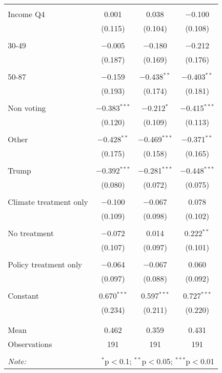 \begin{tabular}{@{\extracolsep{5pt}}lccc}
  & & & \\ 
 Income Q4 & 0.001 & 0.038 & $-$0.100 \\ 
  & (0.115) & (0.104) & (0.108) \\ 
  & & & \\ 
 30-49 & $-$0.005 & $-$0.180 & $-$0.212 \\ 
  & (0.187) & (0.169) & (0.176) \\ 
  & & & \\ 
 50-87 & $-$0.159 & $-$0.438$^{**}$ & $-$0.403$^{**}$ \\ 
  & (0.193) & (0.174) & (0.181) \\ 
  & & & \\ 
 Non voting & $-$0.383$^{***}$ & $-$0.212$^{*}$ & $-$0.415$^{***}$ \\ 
  & (0.120) & (0.109) & (0.113) \\ 
  & & & \\ 
 Other & $-$0.428$^{**}$ & $-$0.469$^{***}$ & $-$0.371$^{**}$ \\ 
  & (0.175) & (0.158) & (0.165) \\ 
  & & & \\ 
 Trump & $-$0.392$^{***}$ & $-$0.281$^{***}$ & $-$0.448$^{***}$ \\ 
  & (0.080) & (0.072) & (0.075) \\ 
  & & & \\ 
 Climate treatment only & $-$0.100 & $-$0.067 & 0.078 \\ 
  & (0.109) & (0.098) & (0.102) \\ 
  & & & \\ 
 No treatment & $-$0.072 & 0.014 & 0.222$^{**}$ \\ 
  & (0.107) & (0.097) & (0.101) \\ 
  & & & \\ 
 Policy treatment only & $-$0.064 & $-$0.067 & 0.060 \\ 
  & (0.097) & (0.088) & (0.092) \\ 
  & & & \\ 
 Constant & 0.670$^{***}$ & 0.597$^{***}$ & 0.727$^{***}$ \\ 
  & (0.234) & (0.211) & (0.220) \\ 
  & & & \\ 
\hline \\[-1.8ex] 
Mean & 0.462 & 0.359 & 0.431 \\ 
Observations & 191 & 191 & 191 \\ 
\hline 
\hline \\[-1.8ex] 
\textit{Note:}  & \multicolumn{3}{r}{$^{*}$p$<$0.1; $^{**}$p$<$0.05; $^{***}$p$<$0.01} \\ 
\end{tabular} 
